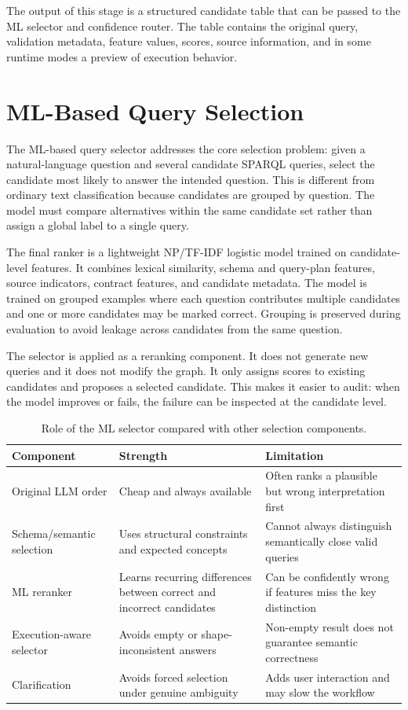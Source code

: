The output of this stage is a structured candidate table that can be passed to the ML selector and confidence router. The table contains the original query, validation metadata, feature values, scores, source information, and in some runtime modes a preview of execution behavior.

\section{ML-Based Query Selection}
\label{sec:ml-based-query-selection}

The ML-based query selector addresses the core selection problem: given a natural-language question and several candidate SPARQL queries, select the candidate most likely to answer the intended question. This is different from ordinary text classification because candidates are grouped by question. The model must compare alternatives within the same candidate set rather than assign a global label to a single query.

The final ranker is a lightweight NP/TF-IDF logistic model trained on candidate-level features. It combines lexical similarity, schema and query-plan features, source indicators, contract features, and candidate metadata. The model is trained on grouped examples where each question contributes multiple candidates and one or more candidates may be marked correct. Grouping is preserved during evaluation to avoid leakage across candidates from the same question.

The selector is applied as a reranking component. It does not generate new queries and it does not modify the graph. It only assigns scores to existing candidates and proposes a selected candidate. This makes it easier to audit: when the model improves or fails, the failure can be inspected at the candidate level.

\begin{table}[ht]
\centering
\caption{Role of the ML selector compared with other selection components.}
\label{tab:selection-components}
\begin{tabular}{p{3.5cm}p{5.8cm}p{4.4cm}}
\hline
\textbf{Component} & \textbf{Strength} & \textbf{Limitation} \\
\hline
Original LLM order & Cheap and always available & Often ranks a plausible but wrong interpretation first \\
Schema/semantic selection & Uses structural constraints and expected concepts & Cannot always distinguish semantically close valid queries \\
ML reranker & Learns recurring differences between correct and incorrect candidates & Can be confidently wrong if features miss the key distinction \\
Execution-aware selector & Avoids empty or shape-inconsistent answers & Non-empty result does not guarantee semantic correctness \\
Clarification & Avoids forced selection under genuine ambiguity & Adds user interaction and may slow the workflow \\
\hline
\end{tabular}
\end{table}

